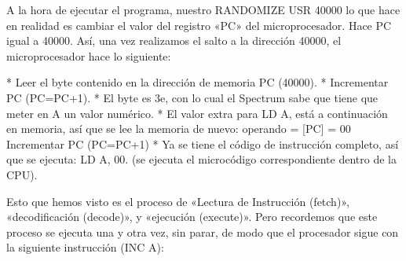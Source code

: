 \documentclass[letterpaper,10pt,spanish]{sphinxmanual}
\begin{document}
A la hora de ejecutar el programa, nuestro RANDOMIZE USR 40000 lo que hace en realidad es cambiar el valor del registro «PC» del microprocesador. Hace PC igual a 40000. Así, una vez realizamos el salto a la dirección 40000, el microprocesador hace lo siguiente:

\begin{sphinxVerbatim}[commandchars=\\\{\}]
* Leer el byte contenido en la dirección de memoria \PYGZdq{}PC\PYGZdq{} (40000).
* Incrementar PC (PC=PC+1).
* El byte es \PYGZdq{}\PYGZdl{}3e\PYGZdq{}, con lo cual el Spectrum sabe que
  tiene que meter en A un valor numérico.
* El valor extra para \PYGZdq{}LD A,\PYGZdq{} está a continuación en memoria,
  así que se lee la memoria de nuevo:
        \PYGZhy{} operando = [PC] = \PYGZdl{}00
        \PYGZhy{} Incrementar PC (PC=PC+1)
* Ya se tiene el \PYGZdq{}código de instrucción completo\PYGZdq{}, así que se
    ejecuta: \PYGZdq{}LD A, 00\PYGZdq{}. (se ejecuta el microcódigo
    correspondiente dentro de la CPU).
\end{sphinxVerbatim}

Esto que hemos visto es el proceso de «Lectura de Instrucción (fetch)», «decodificación (decode)», y «ejecución (execute)». Pero recordemos que este proceso se ejecuta una y otra vez, sin parar, de modo que el procesador sigue con la siguiente instrucción (INC A):

\begin{sphinxVerbatim}[commandchars=\\\{\}]
           
   
               
           
          
\end{sphinxVerbatim}
\end{document}
